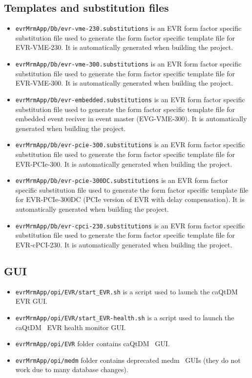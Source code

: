 \documentclass[12pt,a4paper]{article}
\begin{document}
\subsection{Templates and substitution files}\label{sec:mrfioc2 organization:substitution}
\begin{itemize}
\item 
	\texttt{evrMrmApp/Db/evr-vme-230.substitutions} is an EVR form factor specific substitution file used to generate the form factor specific template file for EVR-VME-230. It is automatically generated when building the project.
\item 
	\texttt{evrMrmApp/Db/evr-vme-300.substitutions} is an EVR form factor specific substitution file used to generate the form factor specific template file for EVR-VME-300. It is automatically generated when building the project.
\item 
	\texttt{evrMrmApp/Db/evr-embedded.substitutions} is an EVR form factor specific substitution file used to generate the form factor specific template file for embedded event reciver in event master (EVG-VME-300). It is automatically generated when building the project.
\item 
	\texttt{evrMrmApp/Db/evr-pcie-300.substitutions} is an EVR form factor specific substitution file used to generate the form factor specific template file for EVR-PCIe-300. It is automatically generated when building the project.
\item 
	\texttt{evrMrmApp/Db/evr-pcie-300DC.substitutions} is an EVR form factor specific substitution file used to generate the form factor specific template file for EVR-PCIe-300DC (PCIe version of EVR with delay compensation). It is automatically generated when building the project.
\item 
	\texttt{evrMrmApp/Db/evr-cpci-230.substitutions} is an EVR form factor specific substitution file used to generate the form factor specific template file for EVR-cPCI-230. It is automatically generated when building the project.
\end{itemize}

\subsection{GUI}\label{sec:mrfioc2 organization:gui}
\begin{itemize}
\item 
	\texttt{evrMrmApp/opi/EVR/start\_EVR.sh} is a script used to launch the caQtDM~\cite{caqtdm} EVR GUI.
\item 
	\texttt{evrMrmApp/opi/EVR/start\_EVR-health.sh} is a script used to launch the caQtDM~\cite{caqtdm} EVR health monitor GUI.
\item 
	\texttt{evrMrmApp/opi/EVR} folder contains caQtDM~\cite{caqtdm} GUI.
\item 
	\texttt{evrMrmApp/opi/medm} folder contains deprecated medm~\cite{medm} GUIs (they do not work due to many database changes).
\end{itemize}
\end{document}

